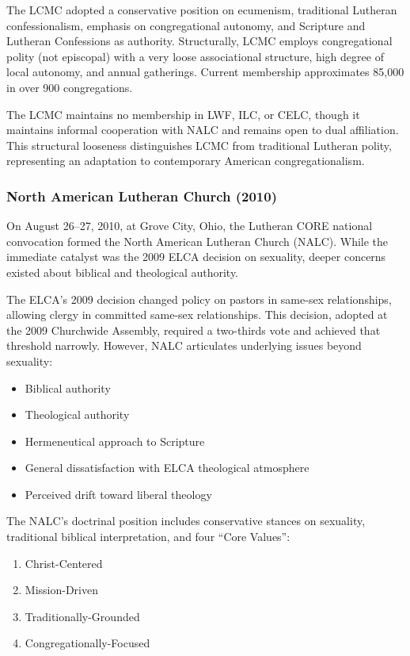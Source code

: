 The LCMC adopted a conservative position on ecumenism, traditional Lutheran confessionalism, emphasis on congregational autonomy, and Scripture and Lutheran Confessions as authority. Structurally, LCMC employs congregational polity (not episcopal) with a very loose associational structure, high degree of local autonomy, and annual gatherings. Current membership approximates 85,000 in over 900 congregations.

The LCMC maintains no membership in LWF, ILC, or CELC, though it maintains informal cooperation with NALC and remains open to dual affiliation. This structural looseness distinguishes LCMC from traditional Lutheran polity, representing an adaptation to contemporary American congregationalism.

\subsubsection{North American Lutheran Church (2010)}

On August 26--27, 2010, at Grove City, Ohio, the Lutheran CORE national convocation formed the North American Lutheran Church (NALC). While the immediate catalyst was the 2009 ELCA decision on sexuality, deeper concerns existed about biblical and theological authority.

The ELCA's 2009 decision changed policy on pastors in same-sex relationships, allowing clergy in committed same-sex relationships. This decision, adopted at the 2009 Churchwide Assembly, required a two-thirds vote and achieved that threshold narrowly. However, NALC articulates underlying issues beyond sexuality:

\begin{itemize}
\item Biblical authority
\item Theological authority
\item Hermeneutical approach to Scripture
\item General dissatisfaction with ELCA theological atmosphere
\item Perceived drift toward liberal theology
\end{itemize}

The NALC's doctrinal position includes conservative stances on sexuality, traditional biblical interpretation, and four ``Core Values'':

\begin{enumerate}
\item Christ-Centered
\item Mission-Driven
\item Traditionally-Grounded
\item Congregationally-Focused
\end{enumerate}

